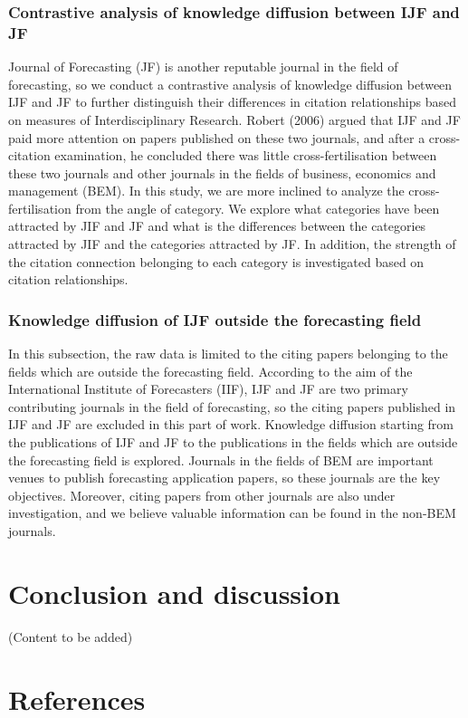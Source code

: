 \documentclass[11pt,a4paper]{elsarticle} %
\begin{document}
\subsubsection{Contrastive analysis of knowledge diffusion between IJF
and
JF}\label{contrastive-analysis-of-knowledge-diffusion-between-ijf-and-jf}

Journal of Forecasting (JF) is another reputable journal in the field of
forecasting, so we conduct a contrastive analysis of knowledge diffusion
between IJF and JF to further distinguish their differences in citation
relationships based on measures of Interdisciplinary Research. Robert
(2006) argued that IJF and JF paid more attention on papers published on
these two journals, and after a cross-citation examination, he concluded
there was little cross-fertilisation between these two journals and
other journals in the fields of business, economics and management
(BEM). In this study, we are more inclined to analyze the
cross-fertilisation from the angle of category. We explore what
categories have been attracted by JIF and JF and what is the differences
between the categories attracted by JIF and the categories attracted by
JF. In addition, the strength of the citation connection belonging to
each category is investigated based on citation relationships.

\subsubsection{Knowledge diffusion of IJF outside the forecasting
field}\label{knowledge-diffusion-of-ijf-outside-the-forecasting-field}

In this subsection, the raw data is limited to the citing papers
belonging to the fields which are outside the forecasting field.
According to the aim of the International Institute of Forecasters
(IIF), IJF and JF are two primary contributing journals in the field of
forecasting, so the citing papers published in IJF and JF are excluded
in this part of work. Knowledge diffusion starting from the publications
of IJF and JF to the publications in the fields which are outside the
forecasting field is explored. Journals in the fields of BEM are
important venues to publish forecasting application papers, so these
journals are the key objectives. Moreover, citing papers from other
journals are also under investigation, and we believe valuable
information can be found in the non-BEM journals.

\section{Conclusion and discussion}\label{conclusion-and-discussion}

(Content to be added)

\section*{References}\label{references}
\end{document}
